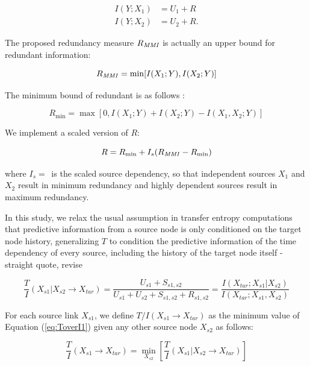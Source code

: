 \documentclass[a4paper]{article}
\begin{document}
\begin{align}
I(Y;X_1) &= U_1+R \label{eq:info12_1}\\
I(Y;X_2) &= U_2+R \label{eq:info12_2}.
\end{align}

The proposed redundancy measure $R_{\it{MMI}}$ \cite{Williams2010,Barrett2014} is actually an upper bound for redundant information:

\begin{equation}\label{eq:RMMI}
R_{\it{MMI}} = \min[I(X_1;Y), I(X_2;Y)]
\end{equation}

The minimum bound of redundant is as follows \cite{Goodwell2016_Syn}: 

\begin{equation}\label{eq:Rmin}
R_{\min} = \max[0, I(X_1;Y)+I(X_2;Y)-I(X_1,X_2;Y)]
\end{equation}

We implement a scaled version of $R$:

\begin{equation}\label{eq:newR}
R = R_{\min} + I_s(R_{\it{MMI}}-R_{\min})
\end{equation}

where $I_s = \frac{}{}$ is the scaled source dependency, so that independent sources $X_1$ and $X_2$ result in minimum redundancy and highly dependent sources result in maximum redundancy.




In this study, we relax the usual assumption in transfer entropy computations that predictive information from a source node is only conditioned on the target node history, generalizing $T$ to condition the predictive information of the time dependency of every source, including the history of the target node itself \cite{Goodwell_2015} -straight quote, revise

\begin{equation}\label{eq:ToverI1}
\frac{T}{I}(X_{s1}|X_{s2} \rightarrow X_{tar}) = \frac{U_{s1}+S_{s1,s2}}{U_{s1}+U_{s2}+S_{s1,s2}+R_{s1,s2}} = \frac{I(X_{tar};X_{s1}|X_{s2})}{I(X_{tar};X_{s1},X_{s2})}
\end{equation}

\noindent
For each source link $X_{s1}$, we define $T/I(X_{s1} \rightarrow X_{tar})$ as the minimum value of Equation (\ref{eq:ToverI1}) given any other source node $X_{s2}$ as follows:

\begin{equation}\label{eq:ToverI2}
\frac{T}{I}(X_{s1} \rightarrow X_{tar}) = \underset{X_{s2}}{\operatorname{min}}  \left[\frac{T}{I}(X_{s1}|X_{s2} \rightarrow X_{tar})\right]
\end{equation}
\end{document}
